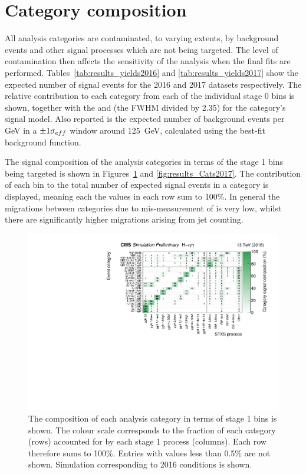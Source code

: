 \newpage %
\section{Category composition}

All analysis categories are contaminated, to varying extents, 
by background events and other signal processes which are not being targeted.
The level of contamination then affects the sensitivity of the analysis 
when the final fits are performed.
Tables~\ref{tab:results_yields2016} and \ref{tab:results_yields2017} 
show the expected number of signal events for the 2016 and 2017 datasets respectively.
The relative contribution to each category from each of the individual stage 0 bins is shown, 
together with the \seff and \shm (the FWHM divided by 2.35) for the category's signal model.
Also reported is the expected number of background events per GeV in a $\pm1\sigma_{eff}$ window 
around \SI{125}{GeV}, calculated using the best-fit background function.

The signal composition of the analysis categories in terms of the stage 1 bins being targeted
is shown in Figures~\ref{fig:results_Cats2016} and \ref{fig:results_Cats2017}.
The contribution of each bin to the total number of expected signal events in a category is displayed, 
meaning each the values in each row sum to 100\%.
In general the migrations between categories due to mis-measurement of \ptgg is very low, 
whilst there are significantly higher migrations arising from jet counting.

\begin{figure}[hptb]
\centering
\includegraphics[width=\textwidth]{Figures/Results/Cats2016.pdf}
\caption{
  The composition of each analysis category in terms of stage 1 bins is shown. 
  The colour scale corresponds to the fraction of each category (rows) 
  accounted for by each stage 1 process (columns). 
  Each row therefore sums to 100\%. 
  Entries with values less than 0.5\% are not shown. 
  Simulation corresponding to 2016 conditions is shown.
}
\label{fig:results_Cats2016}
\end{figure}

